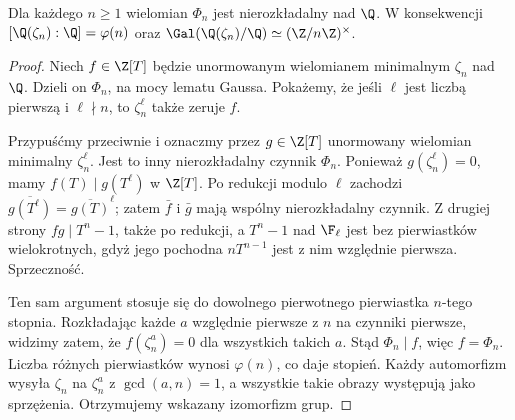 \begin{lemat}
Dla każdego $n\ge1$ wielomian $\Phi_n$ jest nierozkładalny nad $\Q$. W konsekwencji
$[\Q(\zeta_n):\Q]=\varphi(n)$ oraz
$\Gal(\Q(\zeta_n)/\Q)\simeq(\Z/n\Z)^\times$.
\end{lemat}
\begin{proof}
Niech $f\in\Z[T]$ będzie unormowanym wielomianem minimalnym $\zeta_n$ nad $\Q$. Dzieli on $\Phi_n$, na mocy lematu Gaussa. Pokażemy, że jeśli $\ell$ jest liczbą pierwszą i $\ell\nmid n$, to $\zeta_n^\ell$ także zeruje $f$.

Przypuśćmy przeciwnie i oznaczmy przez $g\in\Z[T]$ unormowany wielomian minimalny $\zeta_n^\ell$. Jest to inny nierozkładalny czynnik $\Phi_n$. Ponieważ $g(\zeta_n^\ell)=0$, mamy $f(T)\mid g(T^\ell)$ w $\Z[T]$. Po redukcji modulo $\ell$ zachodzi
$\overline{g(T^\ell)}=\overline{g(T)}^\ell$; zatem $\bar f$ i $\bar g$ mają wspólny nierozkładalny czynnik. Z drugiej strony $fg\mid T^n-1$, także po redukcji, a $T^n-1$ nad $\F_\ell$ jest bez pierwiastków wielokrotnych, gdyż jego pochodna $nT^{n-1}$ jest z nim względnie pierwsza. Sprzeczność.

Ten sam argument stosuje się do dowolnego pierwotnego pierwiastka $n$-tego stopnia. Rozkładając każde $a$ względnie pierwsze z $n$ na czynniki pierwsze, widzimy zatem, że $f(\zeta_n^a)=0$ dla wszystkich takich $a$. Stąd $\Phi_n\mid f$, więc $f=\Phi_n$. Liczba różnych pierwiastków wynosi $\varphi(n)$, co daje stopień. Każdy automorfizm wysyła $\zeta_n$ na $\zeta_n^a$ z $\gcd(a,n)=1$, a wszystkie takie obrazy występują jako sprzężenia. Otrzymujemy wskazany izomorfizm grup.
\end{proof}

